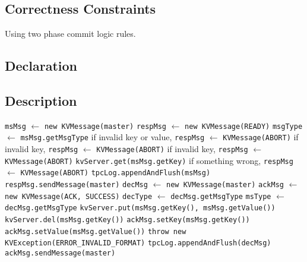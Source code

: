 \documentclass{article}
\begin{document}
\subsection{Correctness Constraints}
\begin{compactitem}
	\item Using two phase commit logic rules.
\end{compactitem}
\subsection{Declaration}
\subsection{Description}
\begin{bframe}
	\begin{algorithmic}
			\State \texttt{msMsg} $\leftarrow$ \texttt{new KVMessage(master)}
			\State \texttt{respMsg} $\leftarrow$ \texttt{new KVMessage(READY)}
			\State \texttt{msgType} $\leftarrow$ \texttt{msMsg.getMsgType}
				\State if invalid key or value, \texttt{respMsg} $\leftarrow$ \texttt{KVMessage(ABORT)}
				\State if invalid key, \texttt{respMsg} $\leftarrow$ \texttt{KVMessage(ABORT)}
				\State if invalid key, \texttt{respMsg} $\leftarrow$ \texttt{KVMessage(ABORT)}
				\State \texttt{kvServer.get(msMsg.getKey)}
				\State if something wrong, \texttt{respMsg} $\leftarrow$ \texttt{KVMessage(ABORT)}
			\EndIf
			\State \texttt{tpcLog.appendAndFlush(msMsg)}
			\State \texttt{respMsg.sendMessage(master)}
			\State
			\State \texttt{decMsg} $\leftarrow$ \texttt{new KVMessage(master)}
			\State \texttt{ackMsg} $\leftarrow$ \texttt{new KVMessage(ACK, SUCCESS)}
			\State \texttt{decType} $\leftarrow$ \texttt{decMsg.getMsgType}
			\State \texttt{msType} $\leftarrow$ \texttt{decMsg.getMsgType}
					\State \texttt{kvServer.put(msMsg.getKey(), msMsg.getValue())}
					\State \texttt{kvServer.del(msMsg.getKey())}
					\State \texttt{ackMsg.setKey(msMsg.getKey())}
					\State \texttt{ackMsg.setValue(msMsg.getValue())}
				\EndIf
			\Else
				\State \texttt{throw new KVException(ERROR\_INVALID\_FORMAT)}
			\EndIf
			\State \texttt{tpcLog.appendAndFlush(decMsg)}
			\State \texttt{ackMsg.sendMessage(master)}
		\EndProcedure
	\end{algorithmic}
\end{bframe}
\end{document}
